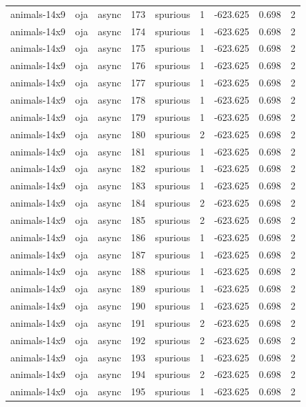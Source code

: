 \begin{tabular}{lllrlrrrr}
animals-14x9 & oja & async & 173 & spurious & 1 & -623.625 & 0.698 & 2 \\
animals-14x9 & oja & async & 174 & spurious & 1 & -623.625 & 0.698 & 2 \\
animals-14x9 & oja & async & 175 & spurious & 1 & -623.625 & 0.698 & 2 \\
animals-14x9 & oja & async & 176 & spurious & 1 & -623.625 & 0.698 & 2 \\
animals-14x9 & oja & async & 177 & spurious & 1 & -623.625 & 0.698 & 2 \\
animals-14x9 & oja & async & 178 & spurious & 1 & -623.625 & 0.698 & 2 \\
animals-14x9 & oja & async & 179 & spurious & 1 & -623.625 & 0.698 & 2 \\
animals-14x9 & oja & async & 180 & spurious & 2 & -623.625 & 0.698 & 2 \\
animals-14x9 & oja & async & 181 & spurious & 1 & -623.625 & 0.698 & 2 \\
animals-14x9 & oja & async & 182 & spurious & 1 & -623.625 & 0.698 & 2 \\
animals-14x9 & oja & async & 183 & spurious & 1 & -623.625 & 0.698 & 2 \\
animals-14x9 & oja & async & 184 & spurious & 2 & -623.625 & 0.698 & 2 \\
animals-14x9 & oja & async & 185 & spurious & 2 & -623.625 & 0.698 & 2 \\
animals-14x9 & oja & async & 186 & spurious & 1 & -623.625 & 0.698 & 2 \\
animals-14x9 & oja & async & 187 & spurious & 1 & -623.625 & 0.698 & 2 \\
animals-14x9 & oja & async & 188 & spurious & 1 & -623.625 & 0.698 & 2 \\
animals-14x9 & oja & async & 189 & spurious & 1 & -623.625 & 0.698 & 2 \\
animals-14x9 & oja & async & 190 & spurious & 1 & -623.625 & 0.698 & 2 \\
animals-14x9 & oja & async & 191 & spurious & 2 & -623.625 & 0.698 & 2 \\
animals-14x9 & oja & async & 192 & spurious & 2 & -623.625 & 0.698 & 2 \\
animals-14x9 & oja & async & 193 & spurious & 1 & -623.625 & 0.698 & 2 \\
animals-14x9 & oja & async & 194 & spurious & 2 & -623.625 & 0.698 & 2 \\
animals-14x9 & oja & async & 195 & spurious & 1 & -623.625 & 0.698 & 2 \\

\end{tabular}
